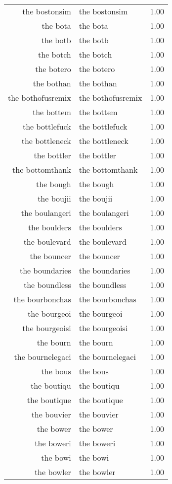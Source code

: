 \begin{table}[ht]
\begin{tabular}{rlr}
  the bostonsim & the bostonsim & 1.00 \\ 
  the bota & the bota & 1.00 \\ 
  the botb & the botb & 1.00 \\ 
  the botch & the botch & 1.00 \\ 
  the botero & the botero & 1.00 \\ 
  the bothan & the bothan & 1.00 \\ 
  the bothofusremix & the bothofusremix & 1.00 \\ 
  the bottem & the bottem & 1.00 \\ 
  the bottlefuck & the bottlefuck & 1.00 \\ 
  the bottleneck & the bottleneck & 1.00 \\ 
  the bottler & the bottler & 1.00 \\ 
  the bottomthank & the bottomthank & 1.00 \\ 
  the bough & the bough & 1.00 \\ 
  the boujii & the boujii & 1.00 \\ 
  the boulangeri & the boulangeri & 1.00 \\ 
  the boulders & the boulders & 1.00 \\ 
  the boulevard & the boulevard & 1.00 \\ 
  the bouncer & the bouncer & 1.00 \\ 
  the boundaries & the boundaries & 1.00 \\ 
  the boundless & the boundless & 1.00 \\ 
  the bourbonchas & the bourbonchas & 1.00 \\ 
  the bourgeoi & the bourgeoi & 1.00 \\ 
  the bourgeoisi & the bourgeoisi & 1.00 \\ 
  the bourn & the bourn & 1.00 \\ 
  the bournelegaci & the bournelegaci & 1.00 \\ 
  the bous & the bous & 1.00 \\ 
  the boutiqu & the boutiqu & 1.00 \\ 
  the boutique & the boutique & 1.00 \\ 
  the bouvier & the bouvier & 1.00 \\ 
  the bower & the bower & 1.00 \\ 
  the boweri & the boweri & 1.00 \\ 
  the bowi & the bowi & 1.00 \\ 
  the bowler & the bowler & 1.00 \\ 

\end{tabular}
\end{table}
